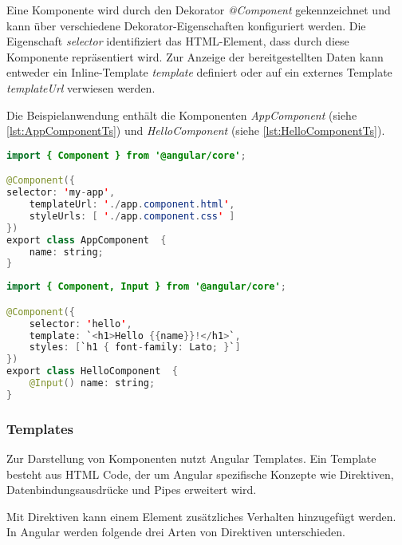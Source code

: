 Eine Komponente wird durch den Dekorator \textit{@Component} gekennzeichnet und kann über verschiedene Dekorator-Eigenschaften konfiguriert werden. Die Eigenschaft \textit{selector} identifiziert das HTML-Element, dass durch diese Komponente repräsentiert wird. Zur Anzeige der bereitgestellten Daten kann entweder ein Inline-Template \textit{template} definiert oder auf ein externes Template \textit{templateUrl} verwiesen werden. \autocites[vgl.][]{Google.b}[vgl.][405]{Freeman.2018}[vgl.][47\psqq]{Steyer.2017}


Die Beispielanwendung enthält die Komponenten \textit{AppComponent} (siehe \autoref{lst:AppComponentTs}) und \textit{HelloComponent} (siehe \autoref{lst:HelloComponentTs}).

\begin{lstlisting}[caption=Die Komponente AppComponent in der Datei app.component.ts, label=lst:AppComponentTs, language=Java]
import { Component } from '@angular/core';

@Component({
selector: 'my-app',
	templateUrl: './app.component.html',
	styleUrls: [ './app.component.css' ]
})
export class AppComponent  {
	name: string;
}
\end{lstlisting}

\begin{lstlisting}[caption=Die Komponente HelloComponent in der Datei hello.component.ts, label=lst:HelloComponentTs, language=Java]
import { Component, Input } from '@angular/core';

@Component({
	selector: 'hello',
	template: `<h1>Hello {{name}}!</h1>`,
	styles: [`h1 { font-family: Lato; }`]
})
export class HelloComponent  {
	@Input() name: string;
}
\end{lstlisting}

\subsubsection{Templates}
Zur Darstellung von Komponenten nutzt Angular Templates. Ein Template besteht aus HTML Code, der um Angular spezifische Konzepte wie Direktiven, Datenbindungsausdrücke und Pipes erweitert wird. \autocites[vgl.][]{Google.b}[vgl.][52]{Steyer.2017} 

Mit Direktiven kann einem Element zusätzliches Verhalten hinzugefügt werden. \autocites[vgl.][265]{Steyer.2017}[vgl.][401]{Freeman.2018} In Angular werden folgende drei Arten von Direktiven unterschieden. \autocite[vgl.][]{Google.}

